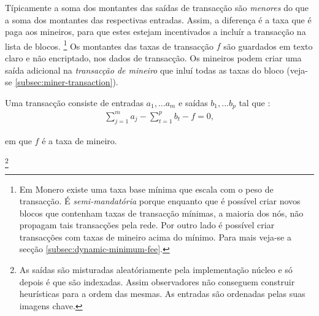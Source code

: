 Típicamente a soma dos montantes das saídas de transacção são {\em menores} do que a soma dos montantes das respectivas entradas. Assim, a diferença é a taxa que é paga aos mineiros, para que estes estejam incentivados a incluír a transacção na lista de blocos.  
\footnote{Em Monero existe uma taxa base mínima que escala com o peso de transacção. É {\em semi-mandatória} porque enquanto que é possível criar novos blocos que contenham taxas de transacção mínimas, a maioria dos nós, não propagam tais transacções pela rede. Por outro lado é possível criar transacções com taxas de mineiro acima do mínimo. Para mais veja-se a secção \ref{subsec:dynamic-minimum-fee}.} 
Os montantes das taxas de transacção $f$ são guardados em texto claro e não encriptado, nos dados de transacção. Os mineiros podem criar uma saída adicional na {\em transacção de mineiro} que inluí todas as taxas do bloco (veja-se \ref{subsec:miner-transaction}).  

Uma transacção consiste de entradas \(a_1, ... a_m\) e saídas \(b_1, ... b_p\) tal que :
\begin{align*}
\sum\limits_{j=1}^m a_j - \sum\limits_{t=1}^{p} b_t - f = 0 ,
\end{align*}

em que $f$ é a taxa de mineiro.

\footnote{As saídas são misturadas aleatóriamente pela implementação núcleo e só depois é que são indexadas. Assim observadores não conseguem construir heurísticas para a ordem das mesmas. As entradas são ordenadas pelas suas imagens chave.}

